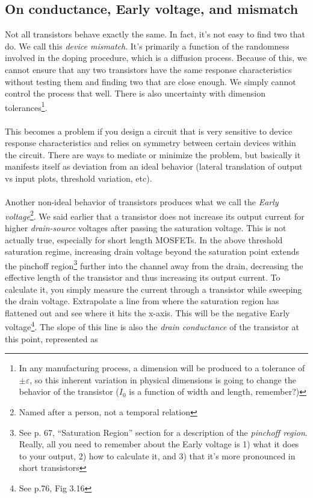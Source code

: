 \documentclass[main]{subfiles}
\begin{document}
\subsection{On conductance, Early voltage, and mismatch}
Not all transistors behave exactly the same. In fact, it's not easy to find two that do. We call this \emph{device mismatch}. It's primarily a function of the randomness involved in the doping procedure, which is a diffusion process. Because of this, we cannot ensure that any two transistors have the same response characteristics without testing them and finding two that are close enough. We simply cannot control the process that well. There is also uncertainty with dimension tolerances\footnote{In any manufacturing process, a dimension will be produced to a tolerance of $\pm\varepsilon$, so this inherent variation in physical dimensions is going to change the behavior of the transistor ($I_0$ is a function of width and length, remember?)}.\\ \\
This becomes a problem if you design a circuit that is very sensitive to device response characteristics and relies on symmetry between certain devices within the circuit. There are ways to mediate or minimize the problem, but  basically it manifests itself as deviation from an ideal behavior (lateral translation of output vs input plots, threshold variation, etc).\\ \\
Another non-ideal behavior of transistors produces what we call the \emph{Early voltage}\footnote{Named after a person, not a temporal relation}. We said earlier that a transistor does not increase its output current for higher \emph{drain-source} voltages after passing the saturation voltage. This is not actually true, especially for short length MOSFETs. In the above threshold saturation regime, increasing drain voltage beyond the saturation point extends the pinchoff region\footnote{See p. 67, ``Saturation Region'' section for a description of the \emph{pinchoff region}. Really, all you need to remember about the Early voltage is 1) what it does to your output, 2) how to calculate it, and 3) that it's more pronounced in short transistors} further into the channel away from the drain, decreasing the effective length of the transistor and thus increasing its output current. To calculate it, you simply measure the current through a transistor while sweeping the drain voltage. Extrapolate a line from where the saturation region has flattened out and see where it hits the x-axis. This will be the negative Early voltage\footnote{See p.76, Fig 3.16}. The slope of this line is also the \emph{drain conductance} of the transistor at this point, represented as
\end{document}
